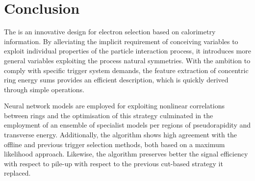 \chapter{Conclusion}\label{sec:conclusion}


The \rnn{} is an innovative design for electron selection based on
calorimetry information. By alleviating the implicit requirement of conceiving
variables to exploit individual properties of the particle interaction process, it introduces 
more general variables exploiting the process natural symmetries. With the
ambition to comply with specific trigger system demands, the feature extraction
of concentric ring energy sums provides an efficient description, which is quickly derived
through simple operations. 


Neural network models are employed for exploiting
nonlinear correlations between rings and the optimisation of this strategy culminated in the employment of an ensemble of specialist models per regions of pseudorapidity and transverse energy. Additionally, the algorithm shows high agreement with the offline and previous trigger selection methods, both based on a maximum likelihood approach. Likewise, the \rnn{} algorithm preserves
better the signal efficiency with respect to pile-up with respect to the
previous cut-based strategy it replaced.


